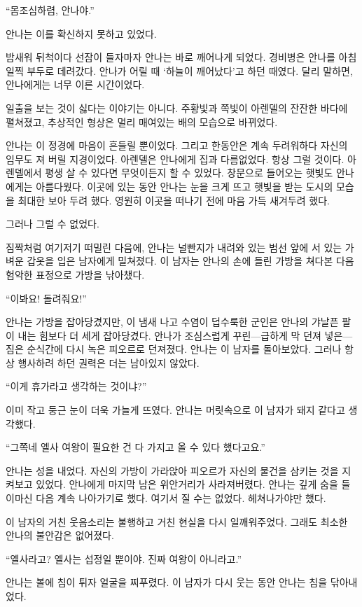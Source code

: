 ``몸조심하렴, 안나야.''

안나는 이를 확신하지 못하고 있었다.

\textbreak

밤새워 뒤척이다 선잠이 들자마자 안나는 바로 깨어나게 되었다. 경비병은 안나를 아침 일찍 부두로 데려갔다. 안나가 어릴 때 `하늘이 깨어났다'고 하던 때였다. 달리 말하면, 안나에게는 너무 이른 시간이었다.

일출을 보는 것이 싫다는 이야기는 아니다. 주황빛과 쪽빛이 아렌델의 잔잔한 바다에 펼쳐졌고, 추상적인 형상은 멀리 매여있는 배의 모습으로 바뀌었다.

안나는 이 정경에 마음이 흔들릴 뿐이었다. 그리고 한동안은 계속 두려워하다 자신의 임무도 져 버릴 지경이었다. 아렌델은 안나에게 집과 다름없었다. 항상 그럴 것이다. 아렌델에서 평생 살 수 있다면 무엇이든지 할 수 있었다. 창문으로 들어오는 햇빛도 안나에게는 아름다웠다. 이곳에 있는 동안 안나는 눈을 크게 뜨고 햇빛을 받는 도시의 모습을 최대한 보아 두려 했다. 영원히 이곳을 떠나기 전에 마음 가득 새겨두려 했다.

그러나 그럴 수 없었다.

짐짝처럼 여기저기 떠밀린 다음에, 안나는 널빤지가 내려와 있는 범선 앞에 서 있는 가벼운 갑옷을 입은 남자에게 밀쳐졌다. 이 남자는 안나의 손에 들린 가방을 쳐다본 다음 험악한 표정으로 가방을 낚아챘다.

``이봐요! 돌려줘요!''

안나는 가방을 잡아당겼지만, 이 냄새 나고 수염이 덥수룩한 군인은 안나의 갸날픈 팔이 내는 힘보다 더 세게 잡아당겼다. 안나가 조심스럽게 꾸린—급하게 막 던져 넣은—짐은 순식간에 다시 녹은 피오르로 던져졌다. 안나는 이 남자를 돌아보았다. 그러나 항상 행사하려 하던 권력은 더는 남아있지 않았다.

``이게 휴가라고 생각하는 것이냐?''

이미 작고 둥근 눈이 더욱 가늘게 뜨였다. 안나는 머릿속으로 이 남자가 돼지 같다고 생각했다.

``그쪽네 엘사 여왕이 필요한 건 다 가지고 올 수 있다 했다고요.''

안나는 성을 내었다. 자신의 가방이 가라앉아 피오르가 자신의 물건을 삼키는 것을 지켜보고 있었다. 안나에게 마지막 남은 위안거리가 사라져버렸다. 안나는 깊게 숨을 들이마신 다음 계속 나아가기로 했다. 여기서 질 수는 없었다. 헤쳐나가야만 했다.

이 남자의 거친 웃음소리는 불행하고 거친 현실을 다시 일깨워주었다. 그래도 최소한 안나의 불안감은 없어졌다.

``엘사라고? 엘사는 섭정일 뿐이야. 진짜 여왕이 아니라고.''

안나는 볼에 침이 튀자 얼굴을 찌푸렸다. 이 남자가 다시 웃는 동안 안나는 침을 닦아내었다.

